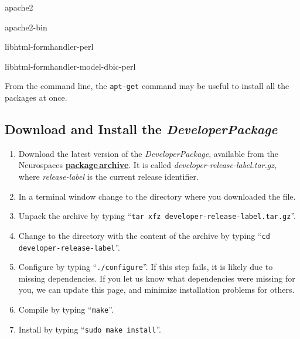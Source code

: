 \documentclass[12pt]{article}
\begin{document}
\begin{description}[noitemsep,nolistsep]

% 
% 
%
% 
% 

\item apache2
\item apache2-bin
\item libhtml-formhandler-perl
\item libhtml-formhandler-model-dbic-perl

\end{description}

From the command line, the {\tt apt-get} command may be useful to
install all the packages at once.


\subsection*{Download and Install the {\emph{DeveloperPackage}}}

\begin{enumerate}
   \item Download the latest version of the {\it DeveloperPackage}, available from the Neurospaces \href{http://repo-genesis3.cbi.utsa.edu/src/}{\bf package\,archive}. It is called {\it developer-release-label.tar.gz}, where {\it release-label} is the current release identifier.
   \item In a terminal window change to the directory where you downloaded the file.
   \item Unpack the archive by typing ``{\tt tar xfz developer-release-label.tar.gz}''.
   \item Change to the directory with the content of the archive by typing ``{\tt cd developer-release-label}''.
   \item Configure by typing ``{\tt ./configure}''.  If this step fails, it is likely due to missing dependencies.  If you let us know what dependencies were missing for you, we can update this page, and minimize installation problems for others.
   \item Compile by typing ``{\tt make}''.
   \item Install by typing ``{\tt sudo make install}''. 
\end{enumerate}
\end{document}
